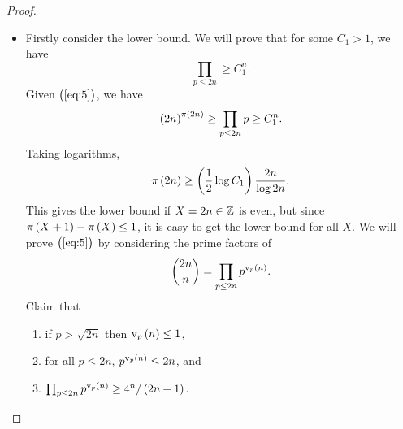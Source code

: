 \begin{proof}
\hfill
\begin{itemize}
\item Firstly consider the lower bound. We will prove that for some $ C_1 > 1 $, we have
\begin{equation}
\label{eq:5}
\prod_{p \le 2n} \ge C_1^n.
\end{equation}
Given $ \br{\ref{eq:5}} $, we have
$$ \br{2n}^{\pi\br{2n}} \ge \prod_{p \le 2n} p \ge C_1^n. $$
Taking logarithms,
$$ \pi\br{2n} \ge \br{\dfrac{1}{2}\log C_1}\dfrac{2n}{\log 2n}. $$
This gives the lower bound if $ X = 2n \in \mathbb{Z} $ is even, but since $ \pi\br{X + 1} - \pi\br{X} \le 1 $, it is easy to get the lower bound for all $ X $. We will prove $ \br{\ref{eq:5}} $ by considering the prime factors of
$$ \binom{2n}{n} = \prod_{p \le 2n} p^{\v_p\br{n}}. $$
Claim that
\begin{enumerate}
\item if $ p > \sqrt{2n} $ then $ \v_p\br{n} \le 1 $,
\item for all $ p \le 2n $, $ p^{\v_p\br{n}} \le 2n $, and
\item $ \prod_{p \le 2n} p^{\v_p\br{n}} \ge 4^n / \br{2n + 1} $.
\end{enumerate}

\pagebreak


\end{itemize}
\end{proof}

